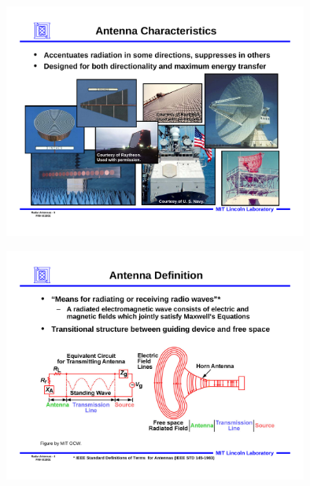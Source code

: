 \documentclass{ctexbeamer}
\begin{document}
\begin{frame}
    \begin{figure}
        \includegraphics[width=10cm]{lecture 6_MIT-part-2.pdf}
    \end{figure}
\end{frame}

\begin{frame}
    \begin{figure}
        \includegraphics[width=10cm]{4_PDFsam_lecture 6_MIT.pdf}
    \end{figure}
\end{frame}
\end{document}
